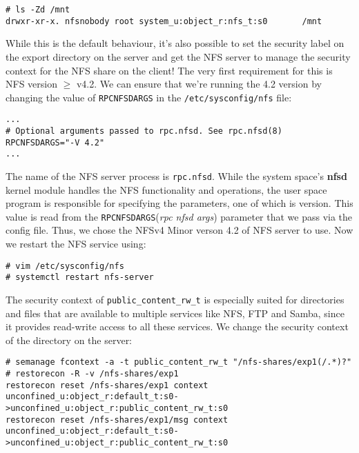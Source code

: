 \vspace{-15pt}
\begin{verbatim}
# ls -Zd /mnt
drwxr-xr-x. nfsnobody root system_u:object_r:nfs_t:s0       /mnt
\end{verbatim}
\vspace{-10pt}	

\noindent
While this is the default behaviour, it's also possible to set the security label on the export directory on the server and get the NFS server to manage the security context for the NFS share on the client! The very first requirement for this is NFS version $\geq$ v4.2. We can ensure that we're running the 4.2 version by changing the value of \verb|RPCNFSDARGS| in the \verb|/etc/sysconfig/nfs| file:

\vspace{-15pt}
\begin{verbatim}
...
# Optional arguments passed to rpc.nfsd. See rpc.nfsd(8)
RPCNFSDARGS="-V 4.2"
...
\end{verbatim}
\vspace{-10pt}	

\noindent
The name of the NFS server process is \verb|rpc.nfsd|. While the system space's \textbf{nfsd} kernel module handles the NFS functionality and operations, the user space program is responsible for specifying the parameters, one of which is version. This value is read from the \verb|RPCNFSDARGS|(\textit{rpc nfsd args}) parameter that we pass via the config file. Thus, we chose the NFSv4 Minor verson 4.2 of NFS server to use. Now we restart the NFS service using:

\vspace{-15pt}
\begin{verbatim}
# vim /etc/sysconfig/nfs
# systemctl restart nfs-server
\end{verbatim}
\vspace{-10pt}
The security context of \verb|public_content_rw_t| is especially suited for directories and files that are available to multiple services like NFS, FTP and Samba, since it provides read-write access to all these services. We change the security context of the directory on the server: 

\vspace{-15pt}
\begin{verbatim}
# semanage fcontext -a -t public_content_rw_t "/nfs-shares/exp1(/.*)?"
# restorecon -R -v /nfs-shares/exp1
restorecon reset /nfs-shares/exp1 context unconfined_u:object_r:default_t:s0->unconfined_u:object_r:public_content_rw_t:s0
restorecon reset /nfs-shares/exp1/msg context unconfined_u:object_r:default_t:s0->unconfined_u:object_r:public_content_rw_t:s0
\end{verbatim}
\vspace{-10pt}	

